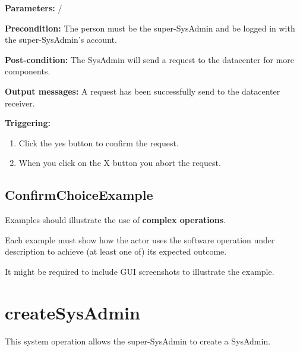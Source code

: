 \begin{description}

\item \textbf{Parameters:} /
\item \textbf{Precondition:} The person must be the super-SysAdmin and be logged
in with the super-SysAdmin's account.
\item \textbf{Post-condition:} The SysAdmin will send a request to the
datacenter for more components.
\item \textbf{Output messages:} A request has been successfully send to the
datacenter receiver.

\item \textbf{Triggering:}
\begin{enumerate}
\item Click the yes button to confirm the request.
\item When you click on the X button you abort the request.
\end{enumerate}

 
\end{description}

\subsection{ConfirmChoiceExample}
Examples should illustrate the use of \textbf{complex operations}.

Each example must show how the actor uses the software operation under
description to achieve (at least one of) its expected outcome.

It might be required to include GUI screenshots to illustrate the example.










\section{createSysAdmin}
\label{operation:createSysAdmin}
This system operation allows the super-SysAdmin to create a SysAdmin.

